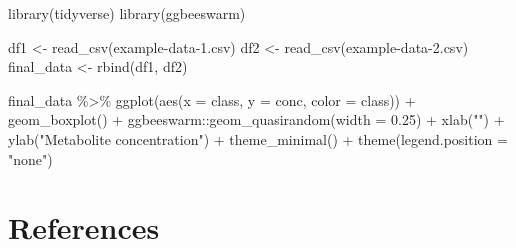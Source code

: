 \documentclass[smallextended]{svjour3}       %
\newenvironment{Shaded}{\begin{snugshade}}{\end{snugshade}}
\newcommand{\AttributeTok}[1]{\textcolor[rgb]{0.77,0.63,0.00}{#1}}
\newcommand{\FloatTok}[1]{\textcolor[rgb]{0.00,0.00,0.81}{#1}}
\newcommand{\FunctionTok}[1]{\textcolor[rgb]{0.00,0.00,0.00}{#1}}
\newcommand{\NormalTok}[1]{#1}
\newcommand{\OtherTok}[1]{\textcolor[rgb]{0.56,0.35,0.01}{#1}}
\newcommand{\SpecialCharTok}[1]{\textcolor[rgb]{0.00,0.00,0.00}{#1}}
\newcommand{\StringTok}[1]{\textcolor[rgb]{0.31,0.60,0.02}{#1}}
\begin{document}
\begin{Shaded}
\begin{Highlighting}[]
\FunctionTok{library}\NormalTok{(tidyverse)}
\FunctionTok{library}\NormalTok{(ggbeeswarm)}

\NormalTok{df1 }\OtherTok{\textless{}{-}} \FunctionTok{read\_csv}\NormalTok{(}\StringTok{\textquotesingle{}example{-}data{-}1.csv\textquotesingle{}}\NormalTok{)}
\NormalTok{df2 }\OtherTok{\textless{}{-}} \FunctionTok{read\_csv}\NormalTok{(}\StringTok{\textquotesingle{}example{-}data{-}2.csv\textquotesingle{}}\NormalTok{)}
\NormalTok{final\_data }\OtherTok{\textless{}{-}} \FunctionTok{rbind}\NormalTok{(df1, df2)}

\NormalTok{final\_data }\SpecialCharTok{\%\textgreater{}\%} 
  \FunctionTok{ggplot}\NormalTok{(}\FunctionTok{aes}\NormalTok{(}\AttributeTok{x =}\NormalTok{ class, }\AttributeTok{y =}\NormalTok{ conc, }\AttributeTok{color =}\NormalTok{ class)) }\SpecialCharTok{+}
  \FunctionTok{geom\_boxplot}\NormalTok{() }\SpecialCharTok{+}
\NormalTok{  ggbeeswarm}\SpecialCharTok{::}\FunctionTok{geom\_quasirandom}\NormalTok{(}\AttributeTok{width =} \FloatTok{0.25}\NormalTok{) }\SpecialCharTok{+} 
  \FunctionTok{xlab}\NormalTok{(}\StringTok{""}\NormalTok{) }\SpecialCharTok{+}
  \FunctionTok{ylab}\NormalTok{(}\StringTok{"Metabolite concentration"}\NormalTok{) }\SpecialCharTok{+} 
  \FunctionTok{theme\_minimal}\NormalTok{() }\SpecialCharTok{+}
  \FunctionTok{theme}\NormalTok{(}\AttributeTok{legend.position =} \StringTok{"none"}\NormalTok{)}
\end{Highlighting}
\end{Shaded}

\hypertarget{references}{%
\section*{References}\label{references}}
\end{document}
